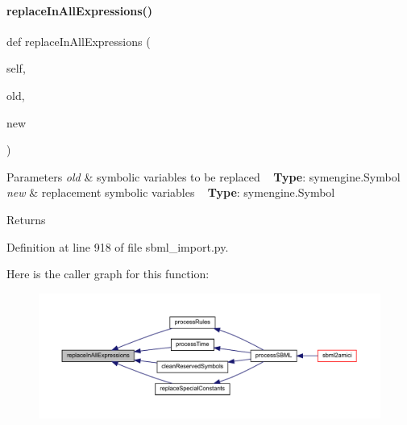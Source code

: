 \paragraph{\texorpdfstring{replace\+In\+All\+Expressions()}{replaceInAllExpressions()}}
{\footnotesize\ttfamily def replace\+In\+All\+Expressions (\begin{DoxyParamCaption}\item[{}]{self,  }\item[{}]{old,  }\item[{}]{new }\end{DoxyParamCaption})}


\begin{DoxyParams}{Parameters}
{\em old} & symbolic variables to be replaced ~\newline
{\bfseries Type}\+: symengine.\+Symbol\\
\hline
{\em new} & replacement symbolic variables ~\newline
{\bfseries Type}\+: symengine.\+Symbol\\
\hline
\end{DoxyParams}
\begin{DoxyReturn}{Returns}

\end{DoxyReturn}


Definition at line 918 of file sbml\+\_\+import.\+py.

Here is the caller graph for this function\+:
\nopagebreak
\begin{figure}[H]
\begin{center}
\leavevmode
\includegraphics[width=350pt]{classamici_1_1sbml__import_1_1_sbml_importer_a1579faf8b188de11ed58ddbebc3c20a7_icgraph}
\end{center}
\end{figure}
\mbox{\label{classamici_1_1sbml__import_1_1_sbml_importer_a122b9921e2fb5bd0fc75310c47413dd1}} 
